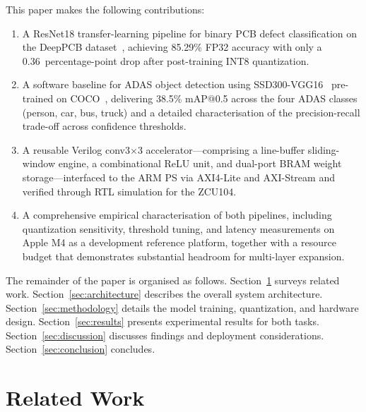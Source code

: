 \documentclass[conference]{IEEEtran}
\begin{document}
This paper makes the following contributions:
\begin{enumerate}
    \item A ResNet18 transfer-learning pipeline for binary PCB defect classification on the DeepPCB dataset~\cite{tang2019deeppcb}, achieving 85.29\% FP32 accuracy with only a 0.36~percentage-point drop after post-training INT8 quantization.
    \item A software baseline for ADAS object detection using SSD300-VGG16~\cite{liu2016ssd} pre-trained on COCO~\cite{lin2014coco}, delivering 38.5\% mAP@0.5 across the four ADAS classes (person, car, bus, truck) and a detailed characterisation of the precision-recall trade-off across confidence thresholds.
    \item A reusable Verilog conv3$\times$3 accelerator---comprising a line-buffer sliding-window engine, a combinational ReLU unit, and dual-port BRAM weight storage---interfaced to the ARM PS via AXI4-Lite and AXI-Stream and verified through RTL simulation for the ZCU104.
    \item A comprehensive empirical characterisation of both pipelines, including quantization sensitivity, threshold tuning, and latency measurements on Apple M4 as a development reference platform, together with a resource budget that demonstrates substantial headroom for multi-layer expansion.
\end{enumerate}

The remainder of the paper is organised as follows. Section~\ref{sec:related} surveys related work. Section~\ref{sec:architecture} describes the overall system architecture. Section~\ref{sec:methodology} details the model training, quantization, and hardware design. Section~\ref{sec:results} presents experimental results for both tasks. Section~\ref{sec:discussion} discusses findings and deployment considerations. Section~\ref{sec:conclusion} concludes.

\section{Related Work}
\label{sec:related}
\end{document}
